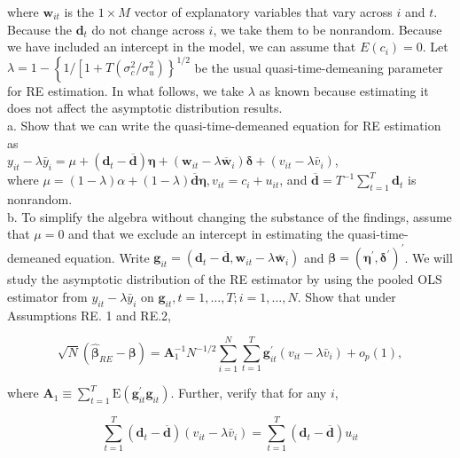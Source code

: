\documentclass[10pt]{article}
\begin{document}
where $\mathbf{w}_{i t}$ is the $1 \times M$ vector of explanatory variables that vary across $i$ and $t$. Because the $\mathbf{d}_{t}$ do not change across $i$, we take them to be nonrandom. Because we have included an intercept in the model, we can assume that $E\left(c_{i}\right)=0$. Let\\
$\lambda=1-\left\{1 /\left[1+T\left(\sigma_{c}^{2} / \sigma_{u}^{2}\right)\right\}^{1 / 2}\right.$ be the usual quasi-time-demeaning parameter for RE estimation. In what follows, we take $\lambda$ as known because estimating it does not affect the asymptotic distribution results.\\
a. Show that we can write the quasi-time-demeaned equation for RE estimation as\\
$y_{i t}-\lambda \bar{y}_{i}=\mu+\left(\mathbf{d}_{t}-\overline{\mathbf{d}}\right) \boldsymbol{\eta}+\left(\mathbf{w}_{i t}-\lambda \overline{\mathbf{w}}_{i}\right) \boldsymbol{\delta}+\left(v_{i t}-\lambda \bar{v}_{i}\right)$,\\
where $\mu=(1-\lambda) \alpha+(1-\lambda) \overline{\mathbf{d}} \boldsymbol{\eta}, v_{i t}=c_{i}+u_{i t}$, and $\overline{\mathbf{d}}=T^{-1} \sum_{t=1}^{T} \mathbf{d}_{t}$ is nonrandom.\\
b. To simplify the algebra without changing the substance of the findings, assume that $\mu=0$ and that we exclude an intercept in estimating the quasi-time-demeaned equation. Write $\mathbf{g}_{i t}=\left(\mathbf{d}_{t}-\overline{\mathbf{d}}, \mathbf{w}_{i t}-\lambda \overline{\mathbf{w}}_{i}\right)$ and $\boldsymbol{\beta}=\left(\boldsymbol{\eta}^{\prime}, \boldsymbol{\delta}^{\prime}\right)^{\prime}$. We will study the asymptotic distribution of the RE estimator by using the pooled OLS estimator from $y_{i t}-\lambda \bar{y}_{i}$ on $\mathbf{g}_{i t}, t=1, \ldots, T ; i=1, \ldots, N$. Show that under Assumptions RE. 1 and RE.2,

$$
\sqrt{N}\left(\hat{\boldsymbol{\beta}}_{R E}-\boldsymbol{\beta}\right)=\mathbf{A}_{1}^{-1} N^{-1 / 2} \sum_{i=1}^{N} \sum_{t=1}^{T} \mathbf{g}_{i t}^{\prime}\left(v_{i t}-\lambda \bar{v}_{i}\right)+o_{p}(1),
$$

where $\mathbf{A}_{1} \equiv \sum_{t=1}^{T} \mathrm{E}\left(\mathbf{g}_{i t}^{\prime} \mathbf{g}_{i t}\right)$. Further, verify that for any $i$,

$$
\sum_{t=1}^{T}\left(\mathbf{d}_{t}-\overline{\mathbf{d}}\right)\left(v_{i t}-\lambda \bar{v}_{i}\right)=\sum_{t=1}^{T}\left(\mathbf{d}_{t}-\overline{\mathbf{d}}\right) u_{i t}
$$
\end{document}
